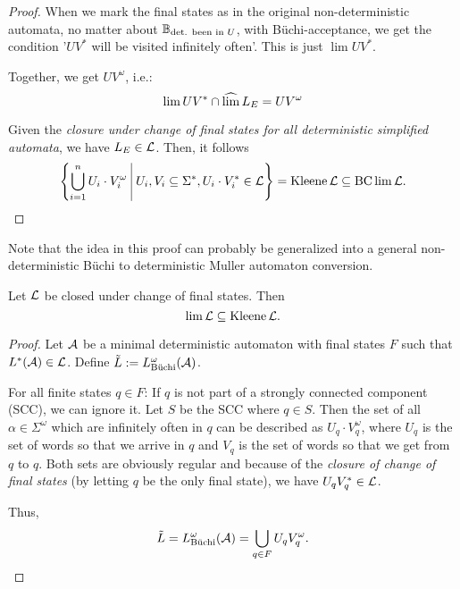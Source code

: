 \begin{lemma}
\begin{proof}
When we mark the final states as in the original non-deterministic automata, no matter about $\mathbb{B}_{\text{det. been in $U$}}$, with Büchi-acceptance, we get the condition '$UV^*$ will be visited infinitely often'. This is just $\lim UV^*$.

Together, we get $UV^\omega$, i.e.:
\[ \lim UV^* \cap \operatorname{\widehat{lim}} L_E = UV^\omega \]

Given the \emph{closure under change of final states for all deterministic simplified automata}, we have $L_E \in \mathcal{L}$. Then, it follows
\[ \Set{ \bigcup_{i=1}^n U_i \cdot V_i^\omega}{U_i,V_i \subseteq \Sigma^*, U_i\cdot V_i^* \in \Lang} = \Kleene \Lang \subseteq \BC \lim \Lang . \]
\end{proof}
\end{lemma}

Note that the idea in this proof can probably be generalized into a general non-deterministic Büchi to deterministic Muller automaton conversion.

\begin{lemma}
Let $\mathcal{L}$ be closed under change of final states. Then
\[ \lim \mathcal{L} \subseteq \operatorname{Kleene} \mathcal{L} . \]
\begin{proof}
Let $\mathcal{A}$ be a minimal deterministic automaton with final states $F$ such that $L^*(\mathcal{A}) \in \mathcal{L}$. Define $\tilde L := L^\omega_{\text{Büchi}}(\mathcal{A})$.

For all finite states $q \in F$: If $q$ is not part of a strongly connected component (SCC), we can ignore it. Let $S$ be the SCC where $q \in S$. Then the set of all $\alpha \in \Sigma^\omega$ which are infinitely often in $q$ can be described as $U_q \cdot V_q^\omega$, where $U_q$ is the set of words so that we arrive in $q$ and $V_q$ is the set of words so that we get from $q$ to $q$. Both sets are obviously regular and because of the \emph{closure of change of final states} (by letting $q$ be the only final state), we have $U_q V_q^* \in \mathcal{L}$.

Thus,
\[ \tilde L = L^\omega_{\text{Büchi}}(\mathcal{A}) = \bigcup_{q \in F} U_q V_q^\omega . \]
%
%
\end{proof}
\end{lemma}

